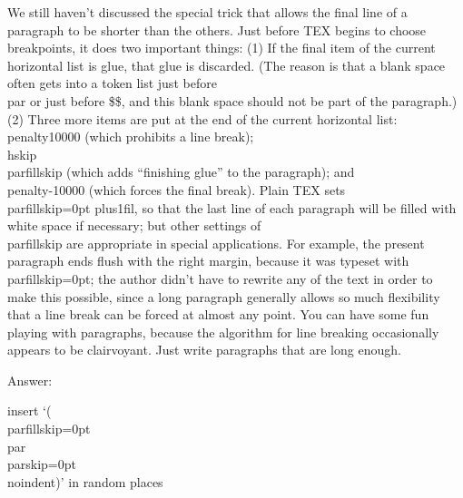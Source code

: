 We still haven’t discussed the special trick that allows the final line of a
paragraph to be shorter than the others.
Just before TEX begins to choose
breakpoints, it does two important things: (1) If the final item of the current horizontal
list is glue, that glue is discarded. 
(The reason is that a blank space often gets into a
token list just before \\par or just before \$\$, 
and this blank space should not be part
of the paragraph.) 
(2) Three more items are put at the end of the current horizontal
list: \\{penalty10000} (which prohibits a line break); \\{hskip\\parfillskip} (which adds
“finishing glue” to the paragraph);
and \\penalty-10000 (which forces the final break).
Plain TEX sets \\parfillskip=0pt plus1fil,
so that the last line of each paragraph will
be filled with white space if necessary;
but other settings of \\parfillskip are appropriate in special applications.
For example, the present paragraph ends flush with the
right margin, because it was typeset with \\parfillskip=0pt; the author didn’t have to
rewrite any of the text in order to make this possible, since a long paragraph generally
allows so much flexibility that a line break can be forced at almost any point. You
can have some fun playing with paragraphs, because the algorithm for line breaking
occasionally appears to be clairvoyant. Just write paragraphs that are long enough.


Answer:

insert ‘(\\parfillskip=0pt\\par\\parskip=0pt\\noindent)’ in random places
\bye
